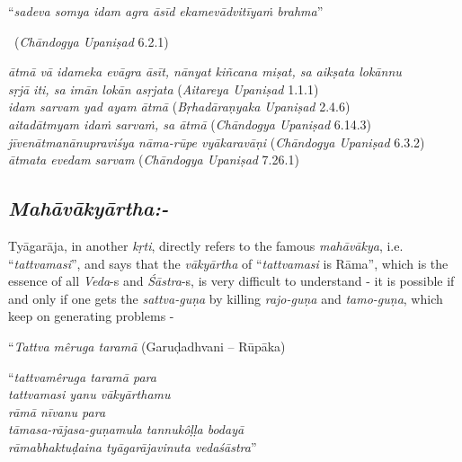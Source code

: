 \begin{myquote}
“\textit{sadeva somya idam agra āsīd ekamevādvitīyaṁ brahma}” 

~\hfill (\textit{Chāndogya Upaniṣad} 6.2.1)
\end{myquote}

\begin{myquote}
\textit{ātmā vā idameka evāgra āsīt, nānyat kiñcana miṣat, sa aikṣata lokānnu}\\ \textit{sṛjā iti, sa imān lokān asṛjata} (\textit{Aitareya Upaniṣad} 1.1.1)\\ \textit{idam sarvam yad ayam ātmā} (\textit{Bṛhadāraṇyaka Upaniṣad} 2.4.6)\\ \textit{aitadātmyam idaṁ sarvaṁ, sa ātmā} (\textit{Chāndogya Upaniṣad} 6.14.3)\\ \textit{jīvenātmanānupraviśya nāma-rūpe vyākaravāṇi} (\textit{Chāndogya Upaniṣad} 6.3.2)\\ \textit{ātmata evedam sarvam} (\textit{Chāndogya Upaniṣad} 7.26.1)
\end{myquote}


\subsection*{\textit{Mahāvākyārtha:-}}

Tyāgarāja, in another \textit{kṛti}, directly refers to the famous \textit{mahāvākya}, i.e. “\textit{tattvamasi}”, and says that the \textit{vākyārtha} of “\textit{tattvamasi} is Rāma”, which is the essence of all \textit{Veda}-s and \textit{Śāstra}-s, is very difficult to understand - it is possible if and only if one gets the \textit{sattva-guṇa} by killing \textit{rajo-guṇa} and \textit{tamo-guṇa}, which keep on generating problems -

“\textit{Tattva mêruga taramā} (Garuḍadhvani – Rūpāka)

\begin{centerquote}
“\textit{tattvamêruga taramā para}\\ \textit{tattvamasi yanu vākyārthamu}\\ \textit{rāmā nīvanu para}\\ \textit{tāmasa-rājasa-guṇamula tannukôḷḷa bodayā}\\ \textit{rāmabhaktuḍaina tyāgarājavinuta vedaśāstra}”
\end{centerquote}

